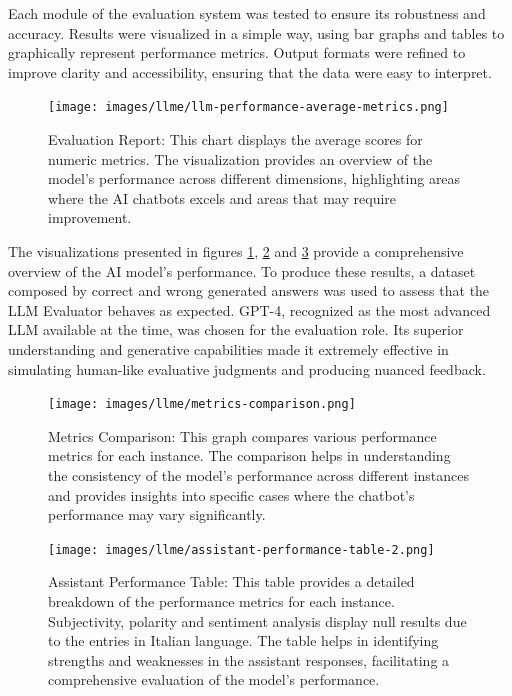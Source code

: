 Each module of the evaluation system was tested to ensure its robustness and accuracy. Results were visualized in a simple way, using bar graphs and tables to graphically represent performance metrics. Output formats were refined to improve clarity and accessibility, ensuring that the data were easy to interpret.

\begin{figure}[h!]
    \centering
    \texttt{[image: images/llme/llm-performance-average-metrics.png]}
    \caption{Evaluation Report: This chart displays the average scores for numeric metrics. The visualization provides an overview of the model's performance across different dimensions, highlighting areas where the AI chatbots excels and areas that may require improvement.}
    \label{fig:llm-performance-average-metrics}
\end{figure}

The visualizations presented in figures \ref{fig:llm-performance-average-metrics}, \ref{fig:metrics-comparison} and \ref{fig:assistant-performance-table} provide a comprehensive overview of the AI model's performance. To produce these results, a dataset composed by correct and wrong generated answers was used to assess that the LLM Evaluator behaves as expected. GPT-4, recognized as the most advanced LLM available at the time, was chosen for the evaluation role. Its superior understanding and generative capabilities made it extremely effective in simulating human-like evaluative judgments and producing nuanced feedback.

\begin{figure}[h!]
    \centering
    \texttt{[image: images/llme/metrics-comparison.png]}
    \caption{Metrics Comparison: This graph compares various performance metrics for each instance. The comparison helps in understanding the consistency of the model's performance across different instances and provides insights into specific cases where the chatbot's performance may vary significantly.}
    \label{fig:metrics-comparison}
\end{figure}

\begin{figure}[h!]
    \centering
    \texttt{[image: images/llme/assistant-performance-table-2.png]}
    \caption{Assistant Performance Table: This table provides a detailed breakdown of the performance metrics for each instance. Subjectivity, polarity and sentiment analysis display null results due to the entries in Italian language. The table helps in identifying strengths and weaknesses in the assistant responses, facilitating a comprehensive evaluation of the model's performance.}
    \label{fig:assistant-performance-table}
\end{figure}

